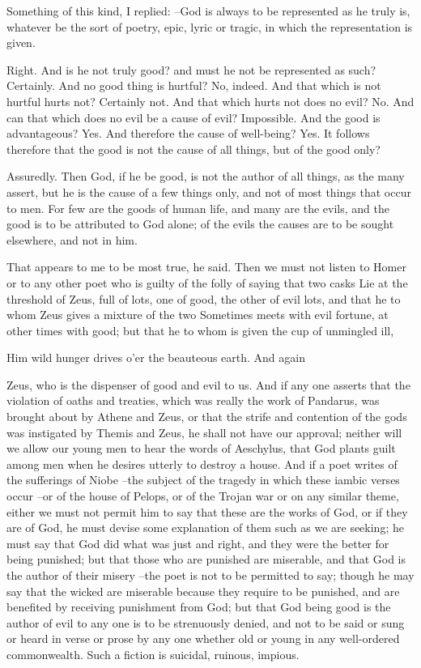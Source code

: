 Something of this kind, I replied: --God is always to be represented as he truly is, whatever be the sort of poetry, epic, lyric or tragic, in which the representation is given.

Right.
And is he not truly good? and must he not be represented as such?
Certainly.
And no good thing is hurtful?
No, indeed.
And that which is not hurtful hurts not?
Certainly not.
And that which hurts not does no evil?
No.
And can that which does no evil be a cause of evil?
Impossible.
And the good is advantageous?
Yes.
And therefore the cause of well-being?
Yes.
It follows therefore that the good is not the cause of all things, but of the good only?

Assuredly.
Then God, if he be good, is not the author of all things, as the many assert, but he is the cause of a few things only, and not of most things that occur to men. For few are the goods of human life, and many are the evils, and the good is to be attributed to God alone; of the evils the causes are to be sought elsewhere, and not in him.

That appears to me to be most true, he said.
Then we must not listen to Homer or to any other poet who is guilty of the folly of saying that two casks Lie at the threshold of Zeus, full of lots, one of good, the other of evil lots, and that he to whom Zeus gives a mixture of the two Sometimes meets with evil fortune, at other times with good; but that he to whom is given the cup of unmingled ill,

Him wild hunger drives o'er the beauteous earth. And again

Zeus, who is the dispenser of good and evil to us. And if any one asserts that the violation of oaths and treaties, which was really the work of Pandarus, was brought about by Athene and Zeus, or that the strife and contention of the gods was instigated by Themis and Zeus, he shall not have our approval; neither will we allow our young men to hear the words of Aeschylus, that God plants guilt among men when he desires utterly to destroy a house. And if a poet writes of the sufferings of Niobe --the subject of the tragedy in which these iambic verses occur --or of the house of Pelops, or of the Trojan war or on any similar theme, either we must not permit him to say that these are the works of God, or if they are of God, he must devise some explanation of them such as we are seeking; he must say that God did what was just and right, and they were the better for being punished; but that those who are punished are miserable, and that God is the author of their misery --the poet is not to be permitted to say; though he may say that the wicked are miserable because they require to be punished, and are benefited by receiving punishment from God; but that God being good is the author of evil to any one is to be strenuously denied, and not to be said or sung or heard in verse or prose by any one whether old or young in any well-ordered commonwealth. Such a fiction is suicidal, ruinous, impious.

